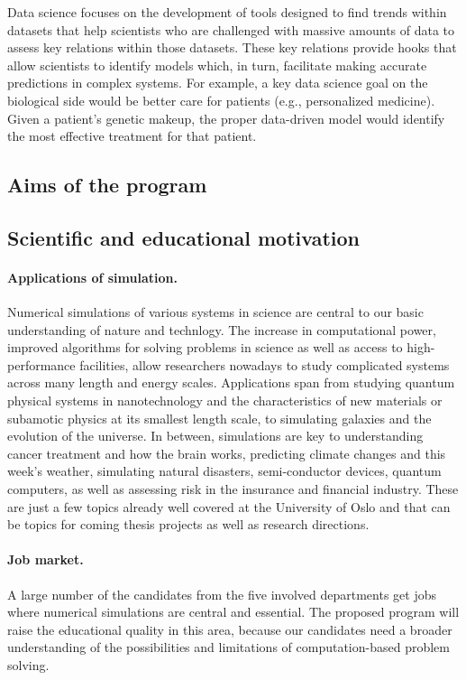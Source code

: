 \documentclass[%
oneside,                 %
final,                   %
10pt]{article}
\begin{document}
Data science focuses on the development of tools designed to find
trends within datasets that help scientists who are challenged with
massive amounts of data to assess key relations within those
datasets. These key relations provide hooks that allow scientists to
identify models which, in turn, facilitate making accurate predictions
in complex systems. For example, a key data science goal on the
biological side would be better care for patients (e.g., personalized
medicine). Given a patient’s genetic makeup, the proper data-driven
model would identify the most effective treatment for that patient.

\subsection*{Aims of the program}

\subsection*{Scientific and educational motivation}


\paragraph{Applications of simulation.}
Numerical simulations of various systems in science are central to our
basic understanding of nature and technlogy.
The increase in computational power,
improved algorithms for solving problems in science as well as access
to high-performance facilities, allow researchers nowadays to study
complicated systems across many length and energy scales. Applications
span from studying quantum physical systems in nanotechnology and the
characteristics of new materials or subamotic physics at its smallest
length scale, to simulating galaxies and the evolution of the universe.
In between, simulations are key to understanding
cancer treatment and how the brain works,
predicting climate changes and this week's weather,
simulating natural disasters, semi-conductor devices,
quantum computers, as well as assessing risk in the insurance and
financial industry. These are just a few topics
already well covered at the University of Oslo and that can be
topics for coming thesis projects as well as research directions.




\paragraph{Job market.}
A large number of the candidates from the five involved departments
get jobs where numerical simulations are central and essential. The proposed
program will raise the educational quality in this area, because
our candidates need a broader understanding of the possibilities
and limitations of computation-based problem solving.
\end{document}
